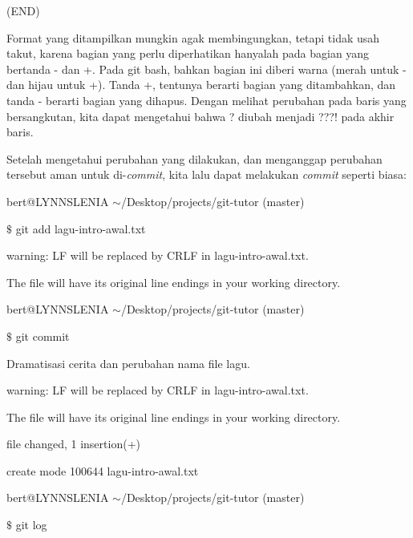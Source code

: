 \noindent 
{\fontsize{10pt}{10pt}\selectfont (END)} \par
Format yang ditampilkan mungkin agak membingungkan, tetapi tidak usah takut, karena bagian yang perlu diperhatikan hanyalah pada bagian yang bertanda - dan +. Pada git bash, bahkan bagian ini diberi warna (merah untuk - dan hijau untuk +). Tanda +, tentunya berarti bagian yang ditambahkan, dan tanda - berarti bagian yang dihapus. Dengan melihat perubahan pada baris yang bersangkutan, kita dapat mengetahui bahwa ? diubah menjadi ???! pada akhir baris. \par
Setelah mengetahui perubahan yang dilakukan, dan menganggap perubahan tersebut aman untuk di-\emph{commit}, kita lalu dapat melakukan \emph{commit} seperti biasa: \par
{\fontsize{10pt}{10pt}\selectfont bert@LYNNSLENIA  $  \sim  $/Desktop/projects/git-tutor (master)} \par
{\fontsize{10pt}{10pt}\selectfont  $  \$  $ git add lagu-intro-awal.txt} \par
{\fontsize{10pt}{10pt}\selectfont warning: LF will be replaced by CRLF in lagu-intro-awal.txt.} \par
{\fontsize{10pt}{10pt}\selectfont The file will have its original line endings in your working directory.} \par
\vspace{10pt}
{\fontsize{10pt}{10pt}\selectfont bert@LYNNSLENIA  $  \sim  $/Desktop/projects/git-tutor (master)} \par
{\fontsize{10pt}{10pt}\selectfont  $  \$  $ git commit} \par
{\fontsize{10pt}{10pt}\selectfont [master 306f422] Dramatisasi cerita dan perubahan nama file lagu.} \par
{\fontsize{10pt}{10pt}\selectfont warning: LF will be replaced by CRLF in lagu-intro-awal.txt.} \par
{\fontsize{10pt}{10pt}\selectfont The file will have its original line endings in your working directory.} \par
{\fontsize{10pt}{10pt} file changed, 1 insertion(+)} \par
{\fontsize{10pt}{10pt}\selectfont  create mode 100644 lagu-intro-awal.txt} \par
\vspace{10pt}
{\fontsize{10pt}{10pt}\selectfont bert@LYNNSLENIA  $  \sim  $/Desktop/projects/git-tutor (master)} \par
{\fontsize{10pt}{10pt}\selectfont  $  \$  $ git log} \par
